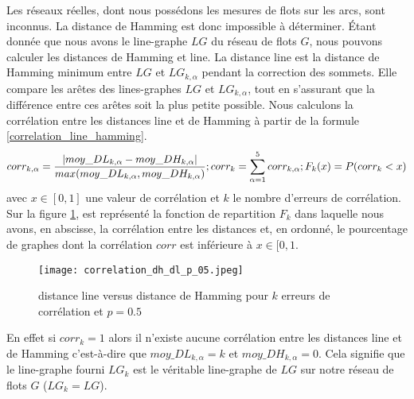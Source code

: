 Les r\'eseaux r\'eelles, dont nous poss\'edons les mesures de flots sur les arcs, sont inconnus.
La distance de Hamming est donc impossible \`a d\'eterminer.
\'Etant donn\'ee que nous avons le line-graphe $LG$ du r\'eseau de flots $G$, nous pouvons calculer les distances de Hamming et line. 
\newline
La distance line est la distance de Hamming minimum entre $LG$ et $LG_{k,\alpha}$ pendant la correction des sommets.
Elle compare les ar\^etes des lines-graphes  $LG$ et $LG_{k,\alpha}$, tout en s'assurant que la diff\'erence entre ces ar\^etes soit la plus petite possible.
\newline
Nous calculons la corr\'elation entre les distances line et de Hamming \`a partir de la formule \ref{correlation_line_hamming}.
\begin{equation}
	corr_{k,\alpha} =  \frac{ | moy\_DL_{k, \alpha} - moy\_DH_{k, \alpha} | }{ max(moy\_DL_{k, \alpha},  moy\_DH_{k, \alpha}) };
	\\
	corr_{k} = \sum_{\alpha = 1}^{5}corr_{k,\alpha} ;
	\\
	F_k (x) = P(corr_{k} < x ) 
\label{correlation_line_hamming}
\end{equation}
avec $x \in [0,1]$ une valeur de corr\'elation et $k$ le nombre d'erreurs de corr\'elation. 
\newline
Sur la figure \ref{dh_vs_dl_p_05}, est repr\'esent\'e la fonction de repartition $F_k$ dans laquelle nous avons, en abscisse, la corr\'elation entre les distances et, en ordonn\'e, le pourcentage de graphes dont la corr\'elation $corr$ est inf\'erieure \`a $x \in [0,1$. 
\begin{figure}[htb!] 
\centering
\texttt{[image: correlation\_dh\_dl\_p\_05.jpeg]}
\caption{ distance line versus distance de Hamming pour $k$ erreurs de corr\'elation et $p = 0.5$ }
\label{dh_vs_dl_p_05} 
\end{figure}
En effet si $corr_k = 1$ alors il n'existe aucune corr\'elation entre les distances line et de Hamming c'est-\`a-dire que $ moy\_DL_{k, \alpha} = k$ et $moy\_DH_{k, \alpha} = 0$. Cela signifie que le line-graphe fourni $LG_{k}$ est  le v\'eritable line-graphe de $LG$ sur notre r\'eseau de flots $G$ ($LG_{k} = LG$). 

